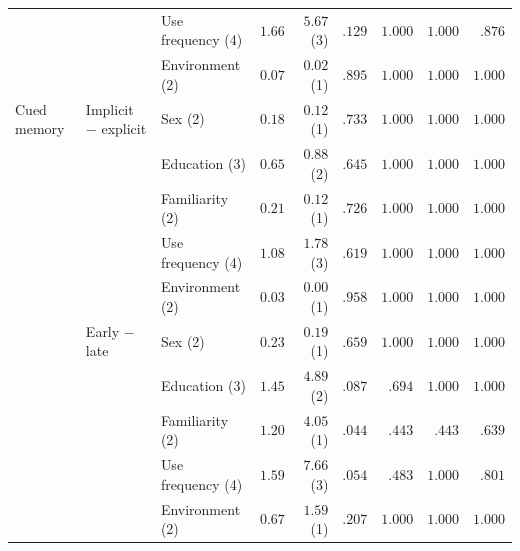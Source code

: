 \begin{table}[H]
\begin{tabular}{@{}ll l r r r r r r@{}}
 &  & Use frequency (4) & $1.66$ & $5.67$ (3) & $.129$ & $1.000$ & $1.000$ & $.876$ \\
 &  & Environment (2) & $0.07$ & $0.02$ (1) & $.895$ & $1.000$ & $1.000$ & $1.000$ \\
\midrule
Cued memory & Implicit \(-\) explicit & Sex (2) & $0.18$ & $0.12$ (1) & $.733$ & $1.000$ & $1.000$ & $1.000$ \\
 &  & Education (3) & $0.65$ & $0.88$ (2) & $.645$ & $1.000$ & $1.000$ & $1.000$ \\
 &  & Familiarity (2) & $0.21$ & $0.12$ (1) & $.726$ & $1.000$ & $1.000$ & $1.000$ \\
 &  & Use frequency (4) & $1.08$ & $1.78$ (3) & $.619$ & $1.000$ & $1.000$ & $1.000$ \\
 &  & Environment (2) & $0.03$ & $0.00$ (1) & $.958$ & $1.000$ & $1.000$ & $1.000$ \\
 & Early \(-\) late & Sex (2) & $0.23$ & $0.19$ (1) & $.659$ & $1.000$ & $1.000$ & $1.000$ \\
 &  & Education (3) & $1.45$ & $4.89$ (2) & $.087$ & $.694$ & $1.000$ & $1.000$ \\
 &  & Familiarity (2) & $1.20$ & $4.05$ (1) & $.044$ & $.443$ & $.443$ & $.639$ \\
 &  & Use frequency (4) & $1.59$ & $7.66$ (3) & $.054$ & $.483$ & $1.000$ & $.801$ \\
 &  & Environment (2) & $0.67$ & $1.59$ (1) & $.207$ & $1.000$ & $1.000$ & $1.000$ \\
\bottomrule
\end{tabular}
\end{table}
